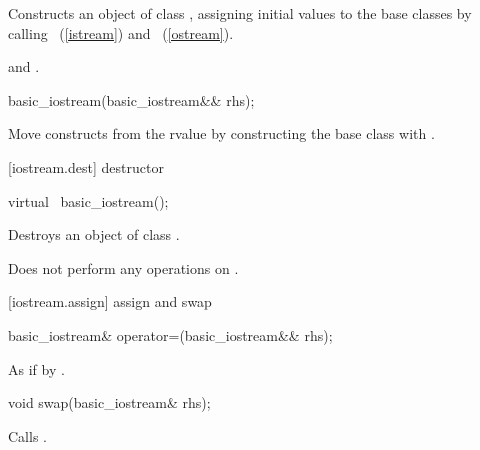 \begin{itemdescr}
\pnum
\effects
Constructs an object of class
,
assigning initial values to the base classes by calling
~(\ref{istream})
and
~(\ref{ostream}).

\pnum
\postcondition
{}
and
.
\end{itemdescr}

%
\begin{itemdecl}
basic_iostream(basic_iostream&& rhs);
\end{itemdecl}

\begin{itemdescr}
\pnum
\effects Move constructs from the rvalue  by
constructing the  base class with
.
\end{itemdescr}

[iostream.dest]{ destructor}

%
\begin{itemdecl}
virtual ~basic_iostream();
\end{itemdecl}

\begin{itemdescr}
\pnum
\effects
Destroys an object of class
.

\pnum
\remarks
Does not perform any operations on
.
\end{itemdescr}

[iostream.assign]{ assign and swap}

%
\begin{itemdecl}
basic_iostream& operator=(basic_iostream&& rhs);
\end{itemdecl}

\begin{itemdescr}
\pnum
\effects As if by .
\end{itemdescr}

%
\begin{itemdecl}
void swap(basic_iostream& rhs);
\end{itemdecl}

\begin{itemdescr}
\pnum
\effects Calls .
\end{itemdescr}


